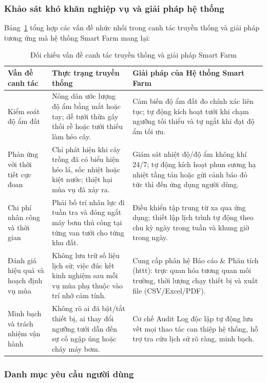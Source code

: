 \subsubsection{Khảo sát khó khăn nghiệp vụ và giải pháp hệ thống}

Bảng~\ref{tab:pain_points} tổng hợp các vấn đề nhức nhối trong canh tác truyền thống và giải pháp tương ứng mà hệ thống Smart Farm mang lại:

\begin{table}[H]
\centering
\small
\begin{tabularx}{\textwidth}{|p{3.2cm}|X|X|}
\hline
\textbf{Vấn đề canh tác} & \textbf{Thực trạng truyền thống} & \textbf{Giải pháp của Hệ thống Smart Farm} \\ \hline
Kiểm soát độ ẩm đất & Nông dân ước lượng độ ẩm bằng mắt hoặc tay; dễ tưới thừa gây thối rễ hoặc tưới thiếu làm héo cây. & Cảm biến độ ẩm đất đo chính xác liên tục; tự động kích hoạt tưới khi chạm ngưỡng tối thiểu và tự ngắt khi đạt độ ẩm tối ưu. \\ \hline
Phản ứng với thời tiết cực đoan & Chỉ phát hiện khi cây trồng đã có biểu hiện héo lá, sốc nhiệt hoặc kiệt nước; thiệt hại mùa vụ đã xảy ra. & Giám sát nhiệt độ/độ ẩm không khí 24/7; tự động kích hoạt phun sương hạ nhiệt tầng tán hoặc gửi cảnh báo đỏ tức thì đến ứng dụng người dùng. \\ \hline
Chi phí nhân công và thời gian & Phải bố trí nhân lực đi tuần tra và đóng ngắt máy bơm thủ công tại từng van tưới cho từng khu đất. & Điều khiển tập trung từ xa qua ứng dụng; thiết lập lịch trình tự động theo chu kỳ ngày trong tuần và khung giờ trong ngày. \\ \hline
Đánh giá hiệu quả và hoạch định vụ mùa & Không lưu trữ số liệu lịch sử; việc đúc kết kinh nghiệm sau mỗi vụ mùa phụ thuộc vào trí nhớ cảm tính. & Cung cấp phân hệ Báo cáo \& Phân tích (\gls{httt}): trực quan hóa tương quan môi trường, thời lượng chạy thiết bị và xuất file (CSV/Excel/PDF). \\ \hline
Minh bạch và trách nhiệm vận hành & Không rõ ai đã bật/tắt thiết bị, ai thay đổi ngưỡng tưới dẫn đến sự cố ngập úng hoặc cháy máy bơm. & Cơ chế Audit Log độc lập tự động lưu vết mọi thao tác can thiệp hệ thống, hỗ trợ tra cứu lịch sử rõ ràng, minh bạch. \\ \hline
\end{tabularx}
\caption{Đối chiếu vấn đề canh tác truyền thống và giải pháp Smart Farm}
\label{tab:pain_points}
\end{table}

\subsubsection{Danh mục yêu cầu người dùng}

